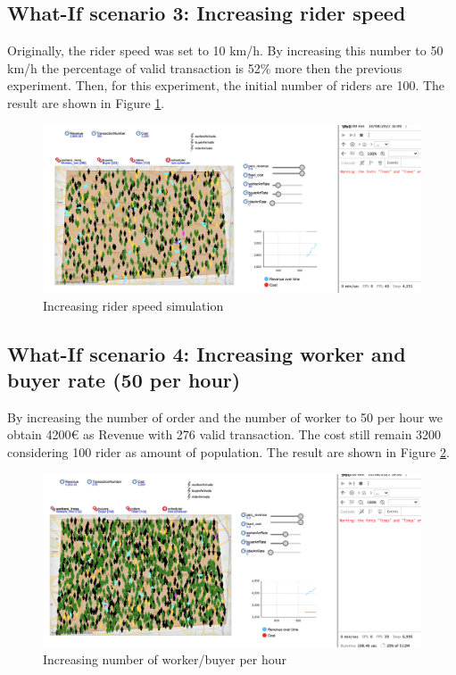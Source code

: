 \subsection{What-If scenario 3: Increasing rider speed}
Originally, the rider speed was set to 10 km/h. By increasing this number to 50 km/h the percentage of valid transaction is 52\% more then the previous experiment. Then, for this experiment, the initial number of riders are 100. 
The result are shown in Figure \ref{figure:sim05}.
\begin{figure}[hbtp]
\caption{Increasing  rider speed simulation}
\label{figure:sim05}
\centering
\includegraphics[scale=0.3]{../Images/sim05.png}
\end{figure}
\subsection{What-If scenario 4: Increasing worker and buyer rate (50 per hour)}
By increasing the number of order and the number of worker to 50 per hour we obtain 4200€ as Revenue with 276 valid transaction. The cost still remain 3200 considering 100 rider as amount of population. 
The result are shown in Figure \ref{figure:sim06}.
\begin{figure}[hbtp]
\caption{Increasing number of worker/buyer per hour }
\centering
\label{figure:sim06}
\includegraphics[scale=0.3]{../Images/sim06.png}
\end{figure}
